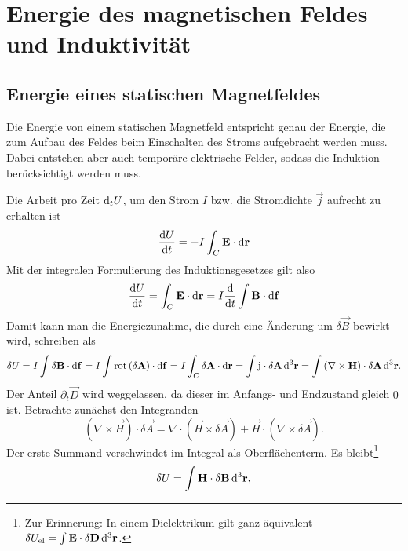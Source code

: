\section{Energie des magnetischen Feldes und Induktivität}

\subsection{Energie eines statischen Magnetfeldes}

Die Energie von einem statischen Magnetfeld entspricht genau der Energie, die zum Aufbau des Feldes beim Einschalten des Stroms aufgebracht werden muss. Dabei entstehen aber auch temporäre elektrische Felder, sodass die Induktion berücksichtigt werden muss.

Die Arbeit pro Zeit $\mathop{}\!\mathrm{d} _{t}U$, um den Strom $I$ bzw. die Stromdichte $\vec {j}$ aufrecht zu erhalten ist
\begin{equation*}
	\frac{\mathop{}\!\mathrm{d} U}{\mathop{}\!\mathrm{d} t}=-I\int _{C}\mathbf{E}\cdot \mathop{}\!\mathrm{d} \mathbf{r}
\end{equation*}
Mit der integralen Formulierung des Induktionsgesetzes gilt also
\begin{equation*}
	\frac{\mathop{}\!\mathrm{d} U}{\mathop{}\!\mathrm{d} t}=\int _{C}\mathbf{E}\cdot \mathop{}\!\mathrm{d} \mathbf{r}=I\frac{\mathop{}\!\mathrm{d} }{\mathop{}\!\mathrm{d} t}\int \mathbf{B}\cdot \mathop{}\!\mathrm{d} \mathbf{f}
\end{equation*}
Damit kann man die Energiezunahme, die durch eine Änderung um $\delta \vec {B}$ bewirkt wird, schreiben als
\begin{equation*}
	\delta U=I\int \delta \mathbf{B}\cdot \mathop{}\!\mathrm{d} \mathbf{f}=I\int \operatorname{rot} \left(\delta \mathbf{A}\right)\cdot \mathop{}\!\mathrm{d} \mathbf{f}=I\int _{C}\delta \mathbf{A}\cdot \mathop{}\!\mathrm{d} \mathbf{r}=\int \mathbf{j}\cdot \delta \mathbf{A}\mathop{}\!\mathrm{d} ^{3}\mathbf{r}=\int \left(\nabla \times \mathbf{H}\right)\cdot \delta \mathbf{A}\mathop{}\!\mathrm{d} ^{3}\mathbf{r}.
\end{equation*}
Der Anteil $\partial _{t}\vec {D}$ wird weggelassen, da dieser im Anfangs- und Endzustand gleich $0$ ist. Betrachte zunächst den Integranden
\begin{equation*}
	\left(\nabla \times \vec {H}\right)\cdot \delta \vec {A}=\nabla \cdot \left(\vec {H}\times \delta \vec {A}\right)+\vec {H}\cdot \left(\nabla \times \delta \vec {A}\right).
\end{equation*}
Der erste Summand verschwindet im Integral als Oberflächenterm. Es bleibt\footnote{Zur Erinnerung: In einem Dielektrikum gilt ganz äquivalent $\delta U_{\mathrm{el}}=\int \mathbf{E}\cdot \delta \mathbf{D}\mathop{}\!\mathrm{d} ^{3}\mathbf{r}$. }
\begin{equation*}
	\delta U=\int \mathbf{H}\cdot \delta \mathbf{B}\mathop{}\!\mathrm{d} ^{3}\mathbf{r},
\end{equation*}
